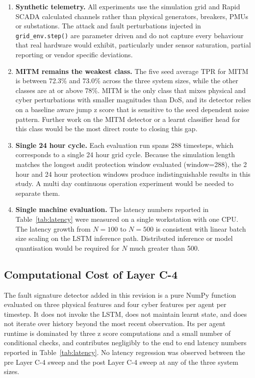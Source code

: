 \begin{enumerate}
    \item \textbf{Synthetic telemetry.} All experiments use the simulation grid and Rapid SCADA calculated channels rather than physical generators, breakers, PMUs or substations. The attack and fault perturbations injected in \texttt{grid\_env.step()} are parameter driven and do not capture every behaviour that real hardware would exhibit, particularly under sensor saturation, partial reporting or vendor specific deviations.
    \item \textbf{MITM remains the weakest class.} The five seed average TPR for MITM is between 72.3\% and 73.0\% across the three system sizes, while the other classes are at or above 78\%. MITM is the only class that mixes physical and cyber perturbations with smaller magnitudes than DoS, and its detector relies on a baseline aware jump z score that is sensitive to the seed dependent noise pattern. Further work on the MITM detector or a learnt classifier head for this class would be the most direct route to closing this gap.
    \item \textbf{Single 24 hour cycle.} Each evaluation run spans 288 timesteps, which corresponds to a single 24 hour grid cycle. Because the simulation length matches the longest audit protection window evaluated (window=288), the 2 hour and 24 hour protection windows produce indistinguishable results in this study. A multi day continuous operation experiment would be needed to separate them.
    \item \textbf{Single machine evaluation.} The latency numbers reported in Table~\ref{tab:latency} were measured on a single workstation with one CPU. The latency growth from $N=100$ to $N=500$ is consistent with linear batch size scaling on the LSTM inference path. Distributed inference or model quantisation would be required for $N$ much greater than 500.
\end{enumerate}

\par \vspace{0.35cm}

\subsection{Computational Cost of Layer C-4}

The fault signature detector added in this revision is a pure NumPy function evaluated on three physical features and four cyber features per agent per timestep. It does not invoke the LSTM, does not maintain learnt state, and does not iterate over history beyond the most recent observation. Its per agent runtime is dominated by three z score computations and a small number of conditional checks, and contributes negligibly to the end to end latency numbers reported in Table~\ref{tab:latency}. No latency regression was observed between the pre Layer C-4 sweep and the post Layer C-4 sweep at any of the three system sizes.

